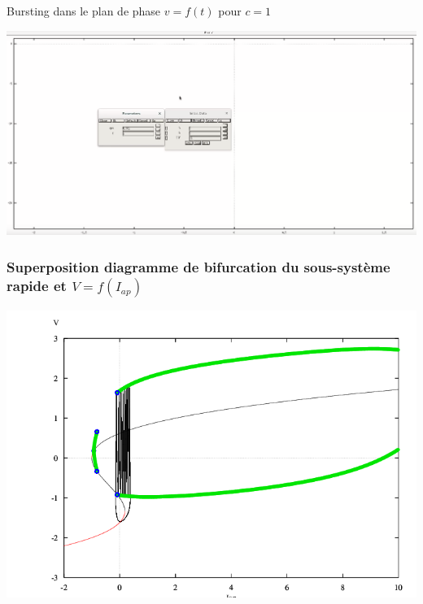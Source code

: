 \documentclass[xcolor={dvipsnames},10pt]{beamer}
\begin{document}
\begin{frame}{Bursting dans le plan de phase $v=f(t)$ pour $c = 1$}
\begin{center}
\href{https://drive.google.com/open?id=0ByPBcq8q0ou_SDgyV19GRTRiQ2M}{\includegraphics[width =  1.0\textwidth]{Burst_c_1_phase}}
\end{center}
\end{frame}

\subsubsection*{Superposition diagramme de bifurcation du sous-système rapide et \texorpdfstring{$V=f(I_{ap})$}{Lg}}


\begin{frame}
\begin{center}
\includegraphics[width = 1\textwidth]{superpositionC1}
\end{center}
\end{frame}
\end{document}
